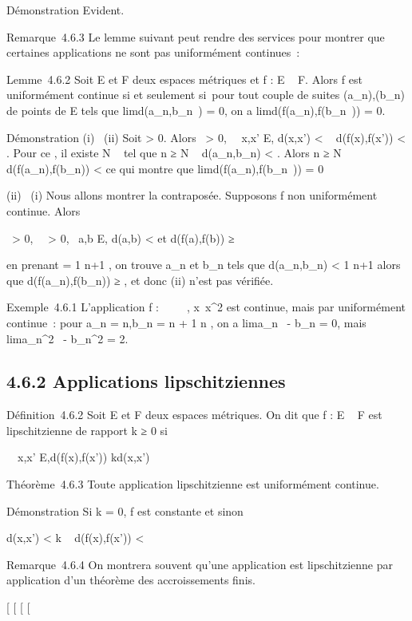 \documentclass[]{article}
\begin{document}
Démonstration Evident.

Remarque~4.6.3 Le lemme suivant peut rendre des services pour montrer
que certaines applications ne sont pas uniformément continues~:

Lemme~4.6.2 Soit E et F deux espaces métriques et f : E \rightarrow~ F. Alors f est
uniformément continue si et seulement si~pour tout couple de suites
(a_n),(b_n) de points de E tels que
limd(a_n,b_n~) = 0, on a
limd(f(a_n),f(b_n~)) = 0.

Démonstration (i) \rigtharrow~(ii) Soit \epsilon > 0. Alors
\exists~\eta > 0,\quad
\forall~~x,x' \in E, d(x,x') < \eta \rigtharrow~
d(f(x),f(x')) < \epsilon. Pour ce \eta, il existe N \in {}~ tel que n ≥ N \rigtharrow~
d(a_n,b_n) < \eta. Alors n ≥ N \rigtharrow~
d(f(a_n),f(b_n)) < \epsilon ce qui montre que
limd(f(a_n),f(b_n~)) = 0

(ii) \rigtharrow~(i) Nous allons montrer la contraposée. Supposons f non
uniformément continue. Alors

\exists~\epsilon > 0,
\forall~~\eta > 0,\quad
\exists~a,b \in E, d(a,b) <
\eta\text et d(f(a),f(b)) ≥ \epsilon

en prenant \eta = 1 \over n+1 , on trouve a_n
et b_n tels que d(a_n,b_n) < 1
\over n+1 alors que d(f(a_n),f(b_n))
≥ \epsilon, et donc (ii) n'est pas vérifiée.

Exemple~4.6.1 L'application f : ~ \rightarrow~ ~,
x\mapsto~x^2 est continue, mais par
uniformément continue~: pour a_n = n,b_n = n + 1
\over n , on a
lima_n~ -
b_n = 0, mais
lima_n^2~ -
b_n^2 = 2.

\subsection{4.6.2 Applications lipschitziennes}

Définition~4.6.2 Soit E et F deux espaces métriques. On dit que f : E \rightarrow~
F est lipschitzienne de rapport k ≥ 0 si

\forall~~x,x' \in E,\quad d(f(x),f(x')) \leq
kd(x,x')

Théorème~4.6.3 Toute application lipschitzienne est uniformément
continue.

Démonstration Si k = 0, f est constante et sinon

d(x,x') < \epsilon \over k \rigtharrow~ d(f(x),f(x'))
< \epsilon

Remarque~4.6.4 On montrera souvent qu'une application est lipschitzienne
par application d'un théorème des accroissements finis.

[
[
[
[
\end{document}

